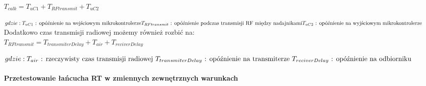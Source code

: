 $ T_{calk} = T_{uC1} + T_{RFtransmit} + T_{uC2} $

$
 gdzie: \\
T_{uC1} \text{ : opóźnienie na wejściowym mikrokontrolerze} \\
T_{RFtransmit}  \text{ : opóźnienie podczas transmisji RF między nadajnikami} \\
T_{uC2} \text{ : opóźnienie na wyjściowym mikrokontrolerze } \\
$
\mbox{}\\

Dodatkowo czas transmisji radiowej możemy również rozbić na: \\

$ T_{RFtransmit} = T_{transmiterDelay} + T_{air} + T_{reciverDelay} $

$
gdzie: \\
T_{air} \text{ : rzeczywisty czas transmisji radiowej } \\
T_{transmiterDelay}  \text{ : opóźnienie na transmiterze } \\
T_{reciverDelay} \text{ : opóźnienie na odbiorniku } \\
$
\mbox{}\\

\paragraph{Przetestowanie łańcucha RT w zmiennych zewnętrznych warunkach } \mbox{}\\

